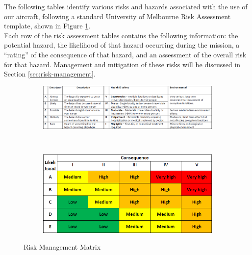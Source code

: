 \label{sec:risk-assessment}
The following tables identify various risks and hazards associated with the use of our aircraft, following a standard University of Melbourne Risk Assessment template, shown in Figure \ref{fig:risk-matrix}.\\

Each row of the risk assessment tables contains the following information: the potential hazard, the likelihood of that hazard occurring during the mission, a ``rating'' of the consequence of that hazard, and an assessment of the overall risk for that hazard. Management and mitigation of these risks will be discussed in Section \ref{sec:risk-management}.

\begin{figure}[H]
	
	\begin{subfigure}{\linewidth}
		\centerline{\includegraphics[width=550pt]{../Images/risk-matrix}}
	\end{subfigure}\\[2ex]
	
	\begin{subfigure}{\linewidth}
		\centerline{\includegraphics[width=300pt]{../Images/risk-matrix-2}}
	\end{subfigure}
	
	\caption{Risk Management Matrix}
	\label{fig:risk-matrix}
\end{figure}

